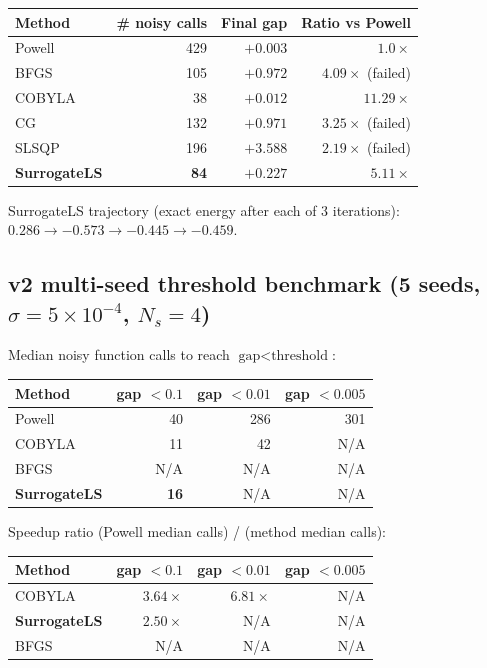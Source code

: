 \documentclass[11pt]{article}
\begin{document}
\begin{center}
\begin{tabular}{lrrr}
\toprule
Method & \# noisy calls & Final gap & Ratio vs Powell \\
\midrule
Powell & 429 & $+0.003$ & $1.0\times$ \\
BFGS   & 105 & $+0.972$ & $4.09\times$ (failed) \\
COBYLA & 38  & $+0.012$ & $11.29\times$ \\
CG     & 132 & $+0.971$ & $3.25\times$ (failed) \\
SLSQP  & 196 & $+3.588$ & $2.19\times$ (failed) \\
\textbf{SurrogateLS} & \textbf{84} & \textbf{$+0.227$} & \textbf{$5.11\times$} \\
\bottomrule
\end{tabular}
\end{center}

SurrogateLS trajectory (exact energy after each of 3 iterations):
$0.286 \to -0.573 \to -0.445 \to -0.459$.

\subsection{v2 multi-seed threshold benchmark (5 seeds, $\sigma=5\times10^{-4}$, $N_s=4$)}

Median noisy function calls to reach $\text{gap} < \text{threshold}$:

\begin{center}
\begin{tabular}{lrrr}
\toprule
Method & gap $<0.1$ & gap $<0.01$ & gap $<0.005$ \\
\midrule
Powell & 40 & 286 & 301 \\
COBYLA & 11 & 42  & N/A \\
BFGS   & N/A & N/A & N/A \\
\textbf{SurrogateLS} & \textbf{16} & N/A & N/A \\
\bottomrule
\end{tabular}
\end{center}

Speedup ratio (Powell median calls) / (method median calls):

\begin{center}
\begin{tabular}{lrrr}
\toprule
Method & gap $<0.1$ & gap $<0.01$ & gap $<0.005$ \\
\midrule
COBYLA & $3.64\times$ & $6.81\times$ & N/A \\
\textbf{SurrogateLS} & \textbf{$2.50\times$} & N/A & N/A \\
BFGS   & N/A & N/A & N/A \\
\bottomrule
\end{tabular}
\end{center}
\end{document}
